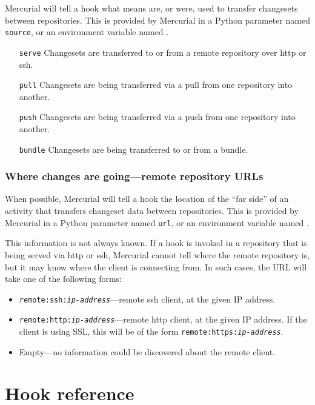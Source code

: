 Mercurial will tell a hook what means are, or were, used to transfer
changesets between repositories.  This is provided by Mercurial in a
Python parameter named \texttt{source}, or an environment variable named
.

\begin{itemize}
\item[\texttt{serve}] Changesets are transferred to or from a remote
  repository over http or ssh.
\item[\texttt{pull}] Changesets are being transferred via a pull from
  one repository into another.
\item[\texttt{push}] Changesets are being transferred via a push from
  one repository into another.
\item[\texttt{bundle}] Changesets are being transferred to or from a
  bundle.
\end{itemize}

\subsubsection{Where changes are going---remote repository URLs}
\label{sec:hook:url}

When possible, Mercurial will tell a hook the location of the ``far
side'' of an activity that transfers changeset data between
repositories.  This is provided by Mercurial in a Python parameter
named \texttt{url}, or an environment variable named .

This information is not always known.  If a hook is invoked in a
repository that is being served via http or ssh, Mercurial cannot tell
where the remote repository is, but it may know where the client is
connecting from.  In such cases, the URL will take one of the
following forms:
\begin{itemize}
\item \texttt{remote:ssh:\emph{ip-address}}---remote ssh client, at
  the given IP address.
\item \texttt{remote:http:\emph{ip-address}}---remote http client, at
  the given IP address.  If the client is using SSL, this will be of
  the form \texttt{remote:https:\emph{ip-address}}.
\item Empty---no information could be discovered about the remote
  client.
\end{itemize}

\section{Hook reference}

